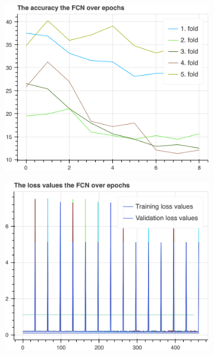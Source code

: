\begin{figure}[H]
\begin{subfigure}[b]{0.49\textwidth}
				\centering
				\includegraphics[width=\textwidth]{img/FCN-accuracy.png}
			\end{subfigure}
			\hfill
			\begin{subfigure}[b]{0.49\textwidth}
				\centering
				\includegraphics[width=\textwidth]{img/FCN-loss_values.png}
			\end{subfigure}
		\end{figure}
